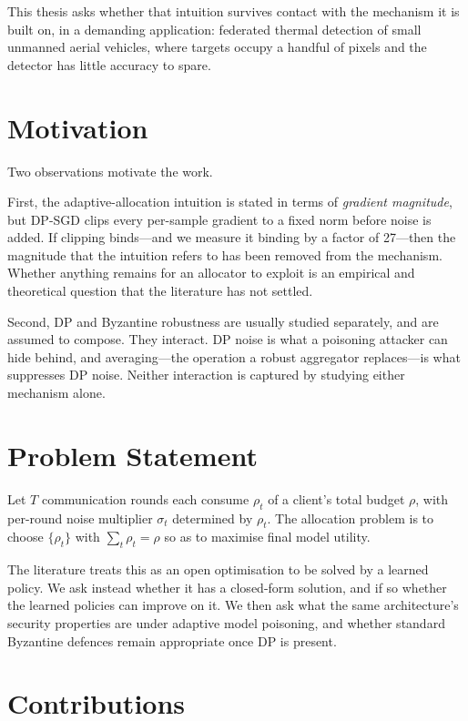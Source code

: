 This thesis asks whether that intuition survives contact with the mechanism it is
built on, in a demanding application: federated thermal detection of small
unmanned aerial vehicles, where targets occupy a handful of pixels and the
detector has little accuracy to spare.

\section{Motivation}

Two observations motivate the work.

First, the adaptive-allocation intuition is stated in terms of \emph{gradient
magnitude}, but DP-SGD clips every per-sample gradient to a fixed norm before
noise is added. If clipping binds---and we measure it binding by a factor of
\num{27}---then the magnitude that the intuition refers to has been removed from
the mechanism. Whether anything remains for an allocator to exploit is an
empirical and theoretical question that the literature has not settled.

Second, DP and Byzantine robustness are usually studied separately, and are
assumed to compose. They interact. DP noise is what a poisoning attacker can hide
behind, and averaging---the operation a robust aggregator replaces---is what
suppresses DP noise. Neither interaction is captured by studying either
mechanism alone.

\section{Problem Statement}

Let $T$ communication rounds each consume $\rho_t$ of a client's total budget
$\rho$, with per-round noise multiplier $\sigma_t$ determined by $\rho_t$. The
allocation problem is to choose $\{\rho_t\}$ with $\sum_t \rho_t = \rho$ so as to
maximise final model utility.

The literature treats this as an open optimisation to be solved by a learned
policy. We ask instead whether it has a closed-form solution, and if so whether
the learned policies can improve on it. We then ask what the same architecture's
security properties are under adaptive model poisoning, and whether standard
Byzantine defences remain appropriate once DP is present.

\section{Contributions}

